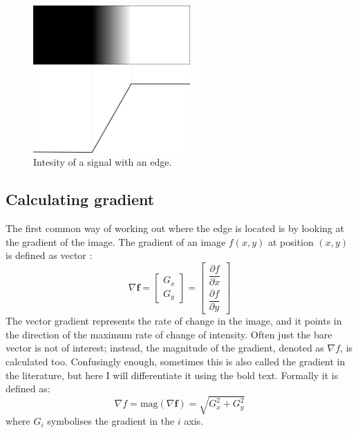 \documentclass[
  digital,     %
  oneside,     %
  nosansbold,  %
  nocolorbold, %
  lof,         %
  lot,         %
]{fithesis4}
\begin{document}
\begin{figure}
    \begin{center}
        \includegraphics[width=6cm]{resources/inkscape/gradient.png}
    \end{center}
    \caption{Intesity of a signal with an edge.}
    \label{fig:edge_intensities}
\end{figure}

\subsection{Calculating gradient}

The first common way of working out where the edge is located is by looking at
the gradient of the image. The gradient of an image $f(x,y)$ at position $(x,
y)$ is defined as vector
\parencite{gonzalez2002}:
$$\nabla \textbf{f} =
\begin{bmatrix}
    G_x \\
    G_y
\end{bmatrix} =
\begin{bmatrix}
    \dfrac{\partial f}{\partial x}\\[2ex]
    \dfrac{\partial f}{\partial y}
\end{bmatrix}$$
The vector gradient represents the rate of change in the image, and it points in
the direction of the maximum rate of change of intensity. Often just the bare
vector is not of interest; instead, the magnitude of the gradient, denoted as
$\nabla f$, is calculated too. Confusingly enough, sometimes this is also called
the gradient in the literature, but here I will differentiate it using the bold
text. Formally it is defined as:
$$\nabla f = \text{mag}(\nabla \textbf{f}) = \sqrt{G_x^2 + G_y^2}$$
where $G_i$ symbolises the gradient in the $i$ axis.
\end{document}
